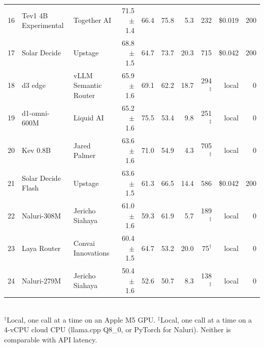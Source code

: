 \begin{table}[t]
{\begin{tabular}{rllrrrrrrr}
16 & Tev1 4B Experimental & Together AI & 71.5 $\pm$1.4 & 66.4 & 75.8 & 5.3 & 232 & \$0.019 & 200 \\
17 & Solar Decide & Upstage & 68.8 $\pm$1.5 & 64.7 & 73.7 & 20.3 & 715 & \$0.042 & 200 \\
18 & d3 edge & vLLM Semantic Router & 65.9 $\pm$1.6 & 69.1 & 62.2 & 18.7 & 294$^\ddagger$ & local & 0 \\
19 & d1-omni-600M & Liquid AI & 65.2 $\pm$1.6 & 75.5 & 53.4 & 9.8 & 251$^\ddagger$ & local & 0 \\
20 & Kev 0.8B & Jared Palmer & 63.6 $\pm$1.6 & 71.0 & 54.9 & 4.3 & 705$^\ddagger$ & local & 0 \\
21 & Solar Decide Flash & Upstage & 63.6 $\pm$1.5 & 61.3 & 66.5 & 14.4 & 586 & \$0.042 & 200 \\
22 & Naluri-308M & Jericho Siahaya & 61.0 $\pm$1.6 & 59.3 & 61.9 & 5.7 & 189$^\ddagger$ & local & 0 \\
23 & Laya Router & Convai Innovations & 60.4 $\pm$1.5 & 64.7 & 53.2 & 20.0 & 75$^\dagger$ & local & 0 \\
24 & Naluri-279M & Jericho Siahaya & 50.4 $\pm$1.6 & 52.6 & 50.7 & 8.3 & 138$^\ddagger$ & local & 0 \\
\bottomrule\end{tabular}}
\\[2pt]\footnotesize $^\dagger$Local, one call at a time on an Apple M5 GPU. $^\ddagger$Local, one call at a time on a 4-vCPU cloud CPU (llama.cpp Q8\_0, or PyTorch for Naluri). Neither is comparable with API latency.
\end{table}

\begin{table}[t]\centering\small
\caption{Vision track, ranked by the Vision Index (mean accuracy over the 5 image datasets). Text rank is the model's place on the System One Index in Table~\ref{tab:text}.}\label{tab:vision}
\end{table}

